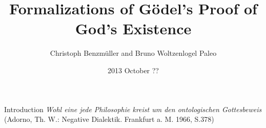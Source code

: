 \documentclass[9pt]{beamer}
\title[Formalizations of G\"{o}del's Proof of God's Existence]{Formalizations of G\"{o}del's Proof of God's Existence}
\author{Christoph Benzm\"{u}ller and Bruno Woltzenlogel Paleo}
\institute[] {
  \inst{}%
}
\date[29.10.13]
{2013 October ??}
\begin{document}
\begin{frame}
  \titlepage
\end{frame}

\begin{frame}{Introduction}
\emph{\huge Wohl eine jede Philosophie kreist um den ontologischen
  Gottesbeweis} \\[2em]

(Adorno, Th. W.: Negative Dialektik. Frankfurt a. M. 1966, S.378)
\end{frame}
\end{document}
